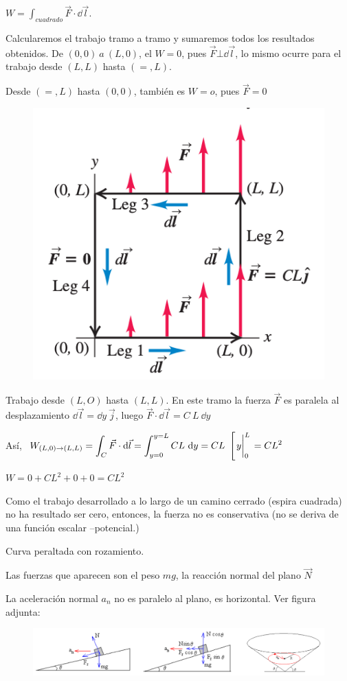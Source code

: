 \begin{multicols}{2}
$W=\displaystyle \int_{cuadrado}\vec F \cdot \dd \vec l$. 

Calcularemos el trabajo tramo a tramo y sumaremos todos los resultados obtenidos.
De $(0,0)\ a \ (L,0)$, el $W=0$, pues $\vec F \bot \dd \vec l$, lo mismo ocurre para el trabajo desde $(L,L)$ hasta $(=,L)$.

Desde $(=,L)$ hasta $(0,0)$, también es $W=o$, pues $\vec F=0$
	\begin{figure}[H]
	\centering
	\includegraphics[width=.5\textwidth]{imagenes/imagenes03/T03IM53.png}
	\end{figure}
\end{multicols}
Trabajo desde $(L,O)$ hasta $(L,L)$. En este tramo la fuerza $\vec F$ es paralela al desplazamiento $\dd \vec l= \dd y\ \vec j$, luego $\vec F \cdot \dd \vec l = C\ L \ \dd y$

Así, $\ \displaystyle W_{(L,0) \to (L,L)} = \int_C \vec F \cdot \dd \vec l = \int_{y=0}^{y=L} C L \ \dd y= C L \ \left[ \eval{y}_0^L \right.=C L^2$

$W=0+CL^2+0+0=CL^2$

Como el trabajo desarrollado a lo largo de un camino cerrado (espira cuadrada) no ha resultado ser cero, entonces, la fuerza no es conservativa (no se deriva de una función escalar --potencial.) 


\begin{prob}
Curva peraltada con rozamiento.	
\end{prob}

Las fuerzas que aparecen son el peso $mg$, la reacción normal del plano $\vec N$

La aceleración normal $a_n$ no es paralelo al plano, es horizontal. Ver figura adjunta:

\begin{figure}[H]
	\centering
	\includegraphics[width=1\textwidth]{imagenes/imagenes03/T03IM56.png}
	\end{figure}


